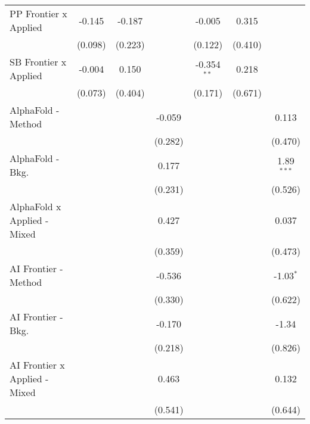 \begin{tabular}{lcccccc}
   PP Frontier x Applied          & -0.145        & -0.187       &                & -0.005        & 0.315        &   \\   
                                  & (0.098)       & (0.223)      &                & (0.122)       & (0.410)      &   \\   
   SB Frontier x Applied          & -0.004        & 0.150        &                & -0.354$^{**}$ & 0.218        &   \\   
                                  & (0.073)       & (0.404)      &                & (0.171)       & (0.671)      &   \\   
   AlphaFold - Method             &               &              & -0.059         &               &              & 0.113\\   
                                  &               &              & (0.282)        &               &              & (0.470)\\   
   AlphaFold - Bkg.               &               &              & 0.177          &               &              & 1.89$^{***}$\\   
                                  &               &              & (0.231)        &               &              & (0.526)\\   
   AlphaFold x Applied - Mixed    &               &              & 0.427          &               &              & 0.037\\   
                                  &               &              & (0.359)        &               &              & (0.473)\\   
   AI Frontier - Method           &               &              & -0.536         &               &              & -1.03$^{*}$\\   
                                  &               &              & (0.330)        &               &              & (0.622)\\   
   AI Frontier - Bkg.             &               &              & -0.170         &               &              & -1.34\\   
                                  &               &              & (0.218)        &               &              & (0.826)\\   
   AI Frontier x Applied - Mixed  &               &              & 0.463          &               &              & 0.132\\   
                                  &               &              & (0.541)        &               &              & (0.644)\\   

\end{tabular}
